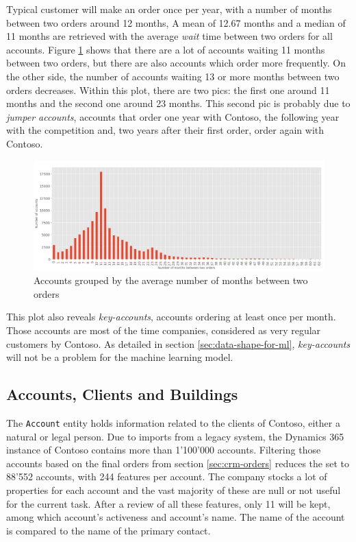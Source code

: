 Typical customer will make an order once per year, with a number of months between two orders around 12 months, A mean of 12.67 months and a median of 11 months are retrieved with the average \textit{wait} time between two orders for all accounts. Figure \ref{fig:orders-account-counts} shows that there are a lot of accounts waiting 11 months between two orders, but there are also accounts which order more frequently. On the other side, the number of accounts waiting 13 or more months between two orders decreases. Within this plot, there are two pics: the first one around 11 months and the second one around 23 months. This second pic is probably due to \textit{jumper accounts}, accounts that order one year with Contoso, the following year with the competition and, two years after their first order, order again with Contoso. 

\begin{figure}[h]
    \centering
    \includegraphics[width=15cm]{images/accounts-average-time-orders.png}
    \caption[Average number of months between two orders]{Accounts grouped by the average number of months between two orders}
    \label{fig:orders-account-counts}
\end{figure}

This plot also reveals \textit{key-accounts}, accounts ordering at least once per month. Those accounts are most of the time companies, considered as very regular customers by Contoso. As detailed in section \ref{sec:data-shape-for-ml}, \textit{key-accounts} will not be a problem for the machine learning model.


\subsection{Accounts, Clients and Buildings}\label{sec:crm-accounts}
The \texttt{Account} entity holds information related to the clients of Contoso, either a natural or legal person. Due to imports from a legacy system, the Dynamics 365 instance of Contoso contains more than 1'100'000 accounts. Filtering those accounts based on the final orders from section \ref{sec:crm-orders} reduces the set to 88'552 accounts, with 244 features per account. The company stocks a lot of properties for each account and the vast majority of these are null or not useful for the current task. After a review of all these features, only 11 will be kept, among which account's activeness and account's name. The name of the account is compared to the name of the primary contact.

